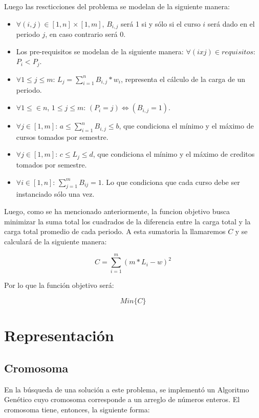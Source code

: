 \documentclass[letter, 10pt]{article}
\begin{document}
Luego las rescticciones del problema se modelan de la siguiente manera:
\begin{itemize}
\item $\forall (i,j) \in [1,n] \times [1,m]$, $B_{i,j}$ será 1 si y sólo si
  el curso $i$ será dado en el periodo $j$, en caso contrario será 0.
 \item Los pre-requisitos se modelan de la siguiente manera: $\forall (i x j) \in
   requisitos$: $P_{i} < P_{j}$.
 \item $\forall 1 \leq j \leq m$: $L_{j} = \sum_{i=1}^{n}{B_{i,j}*w_i}$,
   representa el cálculo de la carga de un periodo.
 \item $\forall 1 \leq \in n$, $1 \leq j \leq m$: $(P_{i}=j) \Leftrightarrow   (B_{i,j}=1)$.
 \item $\forall j \in [1,m]$: $a \leq \sum_{i=1}^{n}{B_{i,j}} \leq b$, que
   condiciona el mínimo y el máximo de cursos tomados por semestre.
 \item $\forall j \in [1,m]$: $c \leq L_{j} \leq d$, que condiciona el
   mínimo y el máximo de creditos tomados por semestre.
 \item $\forall i \in [1,n]$: $\sum_{j=1}^{m}{B_{ij}=1}$. Lo que
   condiciona que cada curso debe ser instanciado sólo una
   vez.
\end{itemize}

Luego, como se ha mencionado anteriormente, la funcion objetivo busca
minimizar la suma total los cuadrados de la diferencia entre la carga
total y la carga total promedio de cada periodo. A esta sumatoria la
llamaremos $C$ y se calculará de la siguiente manera:

\begin{equation*}
  C = \sum_{i=1}^{m}{(m*L_{i}-w)^{2}}
\end{equation*}

Por lo que la función objetivo será:

\begin{equation*}
  Min\{C\}
\end{equation*}


\section{Representación}
\subsection{Cromosoma}
En la búsqueda de una solución a este problema, se implementó un Algoritmo
Genético cuyo cromosoma corresponde a un arreglo de números enteros. El
cromosoma tiene, entonces, la siguiente forma:
\end{document}
